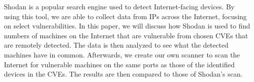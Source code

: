 
Shodan is a popular search engine used to detect Internet-facing devices.
By using this tool, we are able to collect data from IPs across the
Internet, focusing on select vulnerabilities. In this paper, we will
discuss how Shodan is used to find numbers of machines on the Internet
that are vulnerable from chosen CVEs that are remotely detected. The data
is then analyzed to see what the detected machines have in common.
Afterwards, we create our own scanner to scan the Internet for vulnerable
machines on the same ports as those of the identified devices in the CVEs.
The results are then compared to those of Shodan's scan.